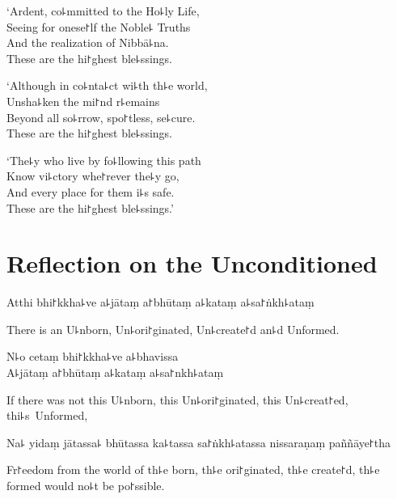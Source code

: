 \clearpage

`Ardent, co꜕mmitted to the Ho꜕ly Life,\\%
Seeing for onese꜓lf the Noble꜕ Truths\\
And the realization of Nibbā꜕na.\\
These are the hi꜓ghest ble꜕ssings.

`Although in co꜕nta꜕ct wi꜕th th꜕e world,\\
Unsha꜕ken the mi꜓nd r꜕emains\\
Beyond all so꜕rrow, spo꜓tless, se꜕cure.\\
These are the hi꜓ghest ble꜕ssings.

`The꜕y who live by fo꜕llowing this path\\
Know vi꜕ctory whe꜓rever the꜕y go,\\
And every place for them i꜕s safe.\\
These are the hi꜓ghest ble꜕ssings.'


\chapter[The Unconditioned]{Reflection on the Unconditioned}%


\begin{leader}
\end{leader}


Atthi bhi꜓kkha꜕ve a꜕jātaṃ a꜓bhūtaṃ a꜕kataṃ a꜕sa꜓ṅkh꜕ataṃ

\begin{english}
  There is an U꜕nborn, Un꜕ori꜓ginated, Un꜕create꜓d an꜕d Unformed.
\end{english}

N꜕o cetaṃ bhi꜓kkha꜕ve a꜕bhavissa\\
A꜕jātaṃ a꜓bhūtaṃ a꜕kataṃ a꜕sa꜓nkh꜕ataṃ

\begin{english}
  If there was not this U꜕nborn, this Un꜕ori꜓ginated, this Un꜕creat꜓ed, thi꜕s~Unformed,
\end{english}

Na꜕ yidaṃ jātassa꜕ bhūtassa ka꜕tassa sa꜓ṅkh꜕atassa nissaraṇaṃ paññāye꜓tha

\begin{english}
  Fr꜓eedom from the world of th꜕e born, th꜕e ori꜓ginated, th꜕e create꜓d, th꜕e formed would no꜕t be po꜓ssible.
\end{english}

